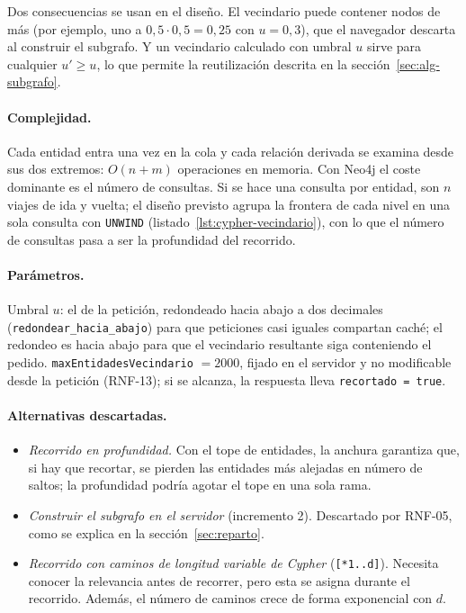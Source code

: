 Dos consecuencias se usan en el diseño. El vecindario puede contener nodos de más (por ejemplo, uno a $0{,}5\cdot0{,}5=0{,}25$ con $u=0{,}3$), que el navegador descarta al construir el subgrafo. Y un vecindario calculado con umbral $u$ sirve para cualquier $u'\ge u$, lo que permite la reutilización descrita en la sección~\ref{sec:alg-subgrafo}.

\paragraph{Complejidad.} Cada entidad entra una vez en la cola y cada relación derivada se examina desde sus dos extremos: $O(n+m)$ operaciones en memoria. Con Neo4j el coste dominante es el número de consultas. Si se hace una consulta por entidad, son $n$ viajes de ida y vuelta; el diseño previsto agrupa la frontera de cada nivel en una sola consulta con \texttt{UNWIND} (listado~\ref{lst:cypher-vecindario}), con lo que el número de consultas pasa a ser la profundidad del recorrido. %

\paragraph{Parámetros.} Umbral $u$: el de la petición, redondeado hacia abajo a dos decimales (\texttt{redondear\_hacia\_abajo}) para que peticiones casi iguales compartan caché; el redondeo es hacia abajo para que el vecindario resultante siga conteniendo el pedido. \texttt{maxEntidadesVecindario} $=2000$, fijado en el servidor y no modificable desde la petición (RNF-13); si se alcanza, la respuesta lleva \texttt{recortado = true}.

\paragraph{Alternativas descartadas.}
\begin{itemize}
  \item \emph{Recorrido en profundidad.} Con el tope de entidades, la anchura garantiza que, si hay que recortar, se pierden las entidades más alejadas en número de saltos; la profundidad podría agotar el tope en una sola rama.
  \item \emph{Construir el subgrafo en el servidor} (incremento 2). Descartado por RNF-05, como se explica en la sección~\ref{sec:reparto}.
  \item \emph{Recorrido con caminos de longitud variable de Cypher} (\texttt{[*1..d]}). Necesita conocer la relevancia antes de recorrer, pero esta se asigna durante el recorrido. Además, el número de caminos crece de forma exponencial con $d$.
\end{itemize}

